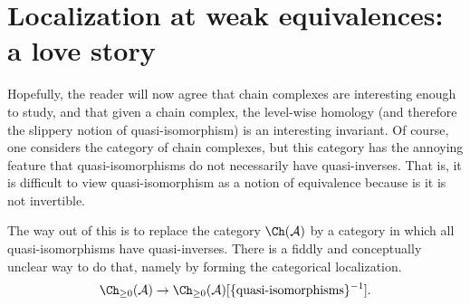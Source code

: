 \documentclass[main.tex]{subfiles}
\begin{document}
\section{Localization at weak equivalences: a love story}
\label{sec:localization_at_weak_equivalences_a_love_story}

%
%

Hopefully, the reader will now agree that chain complexes are interesting enough to study, and that given a chain complex, the level-wise homology (and therefore the slippery notion of quasi-isomorphism) is an interesting invariant. Of course, one considers the category of chain complexes, but this category has the annoying feature that quasi-isomorphisms do not necessarily have quasi-inverses. That is, it is difficult to view quasi-isomorphism as a notion of equivalence because is it is not invertible.

The way out of this is to replace the category $\Ch(\mathcal{A})$ by a category in which all quasi-isomorphisms have quasi-inverses. There is a fiddly and conceptually unclear way to do that, namely by forming the categorical localization.
\begin{equation*}
  \Ch_{\geq 0}(\mathcal{A}) \to \Ch_{\geq 0}(\mathcal{A})[\{\text{quasi-isomorphisms}\}^{-1}].
\end{equation*}
\end{document}
